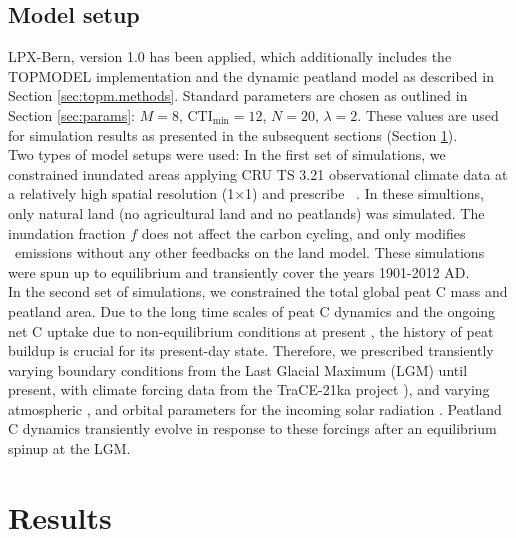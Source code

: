 \clearpage

\subsection{Model setup}
\label{sec:modelsetup.topm}
LPX-Bern, version 1.0 \citep{stocker13natcc} has been applied, which additionally includes the TOPMODEL implementation and the dynamic peatland model as described in Section \ref{sec:topm.methods}. Standard parameters are chosen as outlined in Section \ref{sec:params}: $M=8$, CTI$_{\text{min}}=12$, $N=20$, $\lambda=2$. These values are used for simulation results as presented in the subsequent sections (Section \ref{sec:results}).\\

Two types of model setups were used: In the first set of simulations, we constrained inundated areas applying CRU TS 3.21 observational climate data \citep{harris13} at a relatively high spatial resolution (1\degree $\times$1\degree ) and prescribe \coo\ \citep{etheridge96jgr}. In these simultions, only natural land (no agricultural land and no peatlands) was simulated. The inundation fraction $f$ does not affect the carbon cycling, and only modifies \chh\ emissions without any other feedbacks on the land model. These simulations were spun up to equilibrium and transiently cover the years 1901-2012 AD.\\

In the second set of simulations, we constrained the total global peat C mass and peatland area. Due to the long time scales of peat C dynamics and the ongoing net C uptake due to non-equilibrium conditions at present \citep{spahni13cp}, the history of peat buildup is crucial for its present-day state. Therefore, we prescribed transiently varying boundary conditions from the Last Glacial Maximum (LGM) until present, with climate forcing data from the TraCE-21ka project \citep{liu09}), and varying atmospheric \coo , and orbital parameters for the incoming solar radiation \citep{berger78}. Peatland C dynamics transiently evolve in response to these forcings after an equilibrium spinup at the LGM.\\



\section{Results} 
\label{sec:results}
